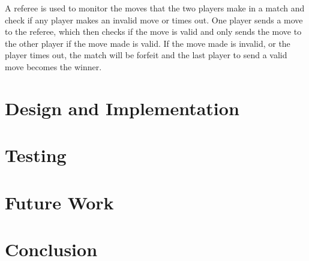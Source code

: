 \documentclass[a4paper, 12pt]{report}
\begin{document}
A referee is used to monitor the moves that the two players make in a match and
check if any player makes an invalid move or times out. One player sends a
move to the referee, which then checks if the move is valid and only sends
the move to the other player if the move made is valid. If the move made is
invalid, or the player times out, the match will be forfeit and the last player
to send a valid move becomes the winner.

\chapter{Design and Implementation}
\label{chap:design}

\chapter{Testing}
\label{chap:testing}

\chapter{Future Work}
\label{chap:future}

\chapter{Conclusion}
\label{chap:conclusion}

\printbibliography
\end{document}
